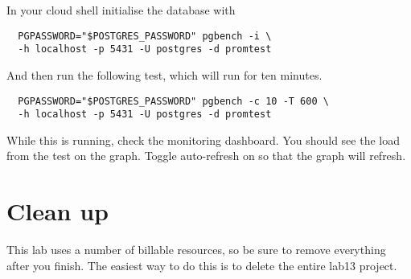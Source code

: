 \documentclass{article}
\begin{document}
In your cloud shell initialise the database with 

\begin{verbatim}
  PGPASSWORD="$POSTGRES_PASSWORD" pgbench -i \
  -h localhost -p 5431 -U postgres -d promtest
\end{verbatim}

And then run the following test, which will run for ten minutes.
\begin{verbatim}
  PGPASSWORD="$POSTGRES_PASSWORD" pgbench -c 10 -T 600 \
  -h localhost -p 5431 -U postgres -d promtest
\end{verbatim}

While this is running, check the monitoring dashboard. You should see the load from the test on the graph. Toggle auto-refresh on so that the graph will refresh.

\section{Clean up}
This lab uses a number of billable resources, so be sure to remove everything after you finish. The easiest way to do this is to delete the entire lab13 project.
 
\end{document}
